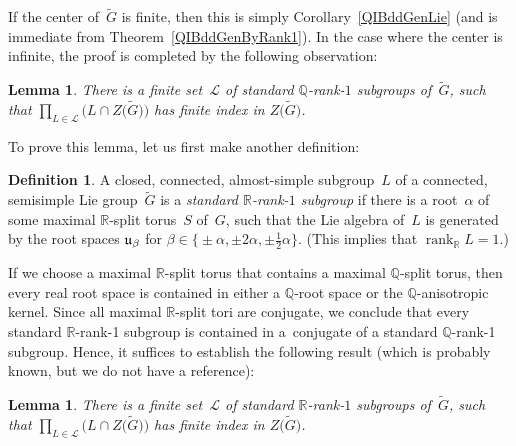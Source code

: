 \documentclass[pdftex]{sigma}
\newcommand{\QQ}{\mathbb{Q}}
\newcommand{\RR}{\mathbb{R}}
\DeclareMathOperator{\rank}{rank}
\newcommand{\cover}{\widetilde}
\newcommand{\Lie}[1]{\lowercase{\mathfrak{#1}}}
\newcommand{\subgroups}{\mathcal{L}}
\numberwithin{equation}{section}
\newtheorem{lem}[thm]{Lemma}
\theoremstyle{definition}
\newtheorem{defn}[thm]{Definition}
\begin{document}
If the center of~$\cover G$ is finite, then this is simply Corollary~\ref{QIBddGenLie} (and is immediate from Theo\-rem~\ref{QIBddGenByRank1}). In the case where the center is infinite, the proof is completed by the following observation:

\begin{lem} \label{QContainsZ} There is a finite set~$\subgroups$ of standard $\QQ$-rank-$1$ subgroups of~$\cover G$, such that $\prod\limits_{L \in \subgroups} \bigl( L \cap Z\big(\cover G\big) \bigr)$ has finite index in $Z\big(\cover G\big)$.
\end{lem}

To prove this lemma, let us first make another definition:

\begin{defn}A closed, connected, almost-simple subgroup~$L$ of a connected, semisimple Lie group~$\cover G$ is a \emph{standard $\RR$-rank-$1$ subgroup} if there is a root~$\alpha$ of some maximal $\RR$-split torus~$S$ of~$G$, such that the Lie algebra of~$L$ is generated by the root spaces $\Lie U_\beta$ for $\beta \in \big\{{\pm} \alpha, \pm 2\alpha, \pm \frac{1}{2} \alpha \big\}$. (This implies that $\rank_\RR L = 1$.)
\end{defn}

If we choose a maximal $\RR$-split torus that contains a maximal $\QQ$-split torus, then every real root space is contained in either a $\QQ$-root space or the $\QQ$-anisotropic kernel. Since all maximal $\RR$-split tori are conjugate, we conclude that every standard $\RR$-rank-1 subgroup is contained in a~conjugate of a standard $\QQ$-rank-1 subgroup. Hence, it suffices to establish the following result (which is probably known, but we do not have a reference):

\begin{lem}There is a finite set~$\subgroups$ of standard $\RR$-rank-$1$ subgroups of~$\cover G$, such that
	$\prod\limits_{L \in \subgroups} \bigl( L \cap Z\big(\cover G\big) \bigr)$
has finite index in $Z\big(\cover G\big)$.
\end{lem}
\end{document}
